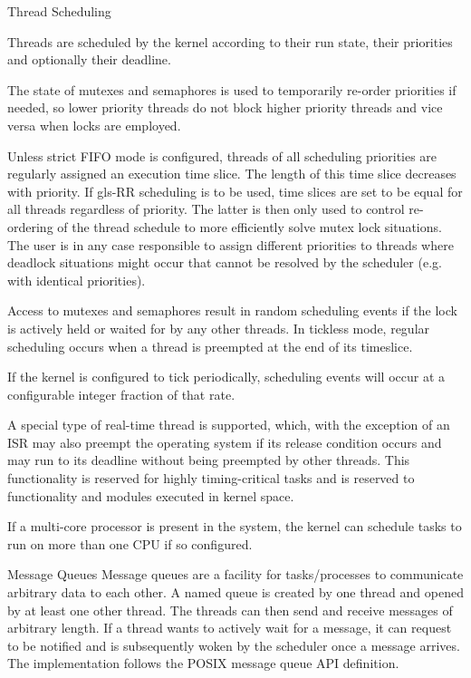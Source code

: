 %
{Thread Scheduling}{%
Threads are scheduled by the kernel according to their run state, their
priorities and optionally their deadline.\newline

The state of mutexes and semaphores is used to temporarily re-order priorities if
needed, so lower priority threads do not block higher priority threads and vice
versa when locks are employed.\newline

Unless strict \gls{FIFO} mode is configured, threads of all scheduling
priorities are regularly assigned an execution time slice. The length of this
time slice decreases with priority. If \gls{gls-RR} scheduling is to be used,
time slices are set to be equal for all threads regardless of priority.
The latter is then only used to control re-ordering of the thread schedule to
more efficiently solve mutex lock situations. The user is in any case
responsible to assign different priorities to threads where deadlock situations
might occur that cannot be resolved by the scheduler (e.g. with identical
priorities).\newline

Access to mutexes and semaphores result in random scheduling events if the lock
is actively held or waited for by any other threads.
In tickless mode, regular scheduling occurs when a thread is preempted at the
end of its timeslice.\newline

If the kernel is configured to tick periodically, scheduling events will occur
at a configurable integer fraction of that rate.\newline

A special type of real-time thread is supported, which, with the exception of
an \gls{ISR} may also preempt the operating system if its release
condition occurs and may run to its deadline without being preempted by other
threads. This functionality is reserved for highly timing-critical tasks and 
is reserved to functionality and modules executed in kernel space.\newline


If a multi-core processor is present in the system, the kernel can schedule
tasks to run on more than one \gls{CPU} if so configured.

}%
{}{}


%
{Message Queues}{%
Message queues are a facility for tasks/processes to communicate arbitrary 
data to each other. A named queue is created by one thread and opened by at
least one other thread. The threads can then send and receive messages
of arbitrary length. If a thread wants to actively wait for a message, it can
request to be notified and is subsequently woken by the scheduler once a message
arrives.
}%
{}{The implementation follows the \gls{POSIX} message
queue \gls{API} definition.}


